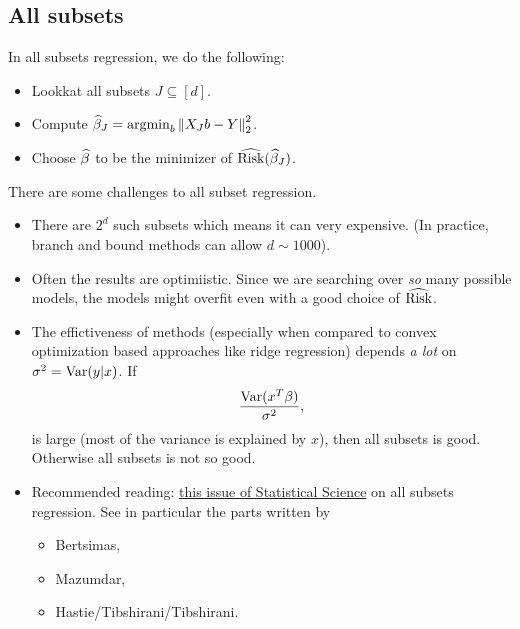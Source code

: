 \subsection{All subsets}
In all subsets regression, we do the following:
\begin{itemize}
    \item Lookkat all subsets $J \subseteq [d]$.
    \item Compute $\widehat{\beta}_J = \operatorname*{argmin}_b \left\|X_J b- Y\right\|_2^2$.
    \item Choose $\widehat{\beta}$ to be the minimizer of $\widehat{\text{Risk}}(\widehat{\beta}_J)$.
\end{itemize}
There are some challenges to all subset regression.
\begin{itemize}
    \item There are $2^d$ such subsets which means it can very expensive. (In practice, branch and bound methods can allow $d \sim 1000$).
    \item Often the results are optimiistic. Since we are searching over \emph{so} many possible models, the models might overfit even with a good choice of $\widehat{\text{Risk}}$.
    \item The effictiveness of methods (especially when compared to convex optimization based approaches like ridge regression) depends \emph{a lot} on $\sigma^2 = \operatorname{Var}(y|x)$. If 
    \[ \frac{\operatorname{Var}(x^T\beta)}{\sigma^2},\]
    is large (most of the variance is explained by $x$), then all subsets is good. Otherwise all subsets is not so good.
    \item Recommended reading: \href{https://projecteuclid.org/journals/statistical-science/volume-35/issue-4}{this issue of Statistical Science} on all subsets regression. See in particular the parts written by
    \begin{itemize}
        \item Bertsimas,
        \item Mazumdar,
        \item Hastie/Tibshirani/Tibshirani.
    \end{itemize}
\end{itemize}
